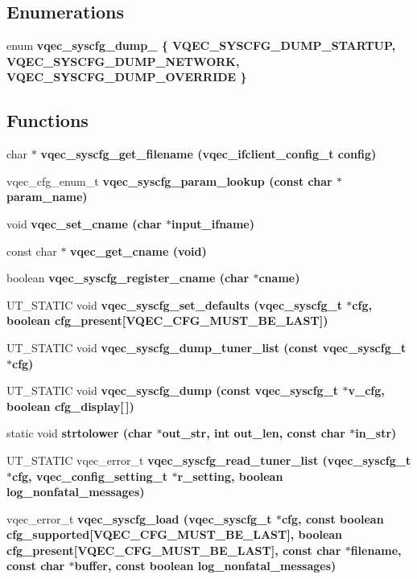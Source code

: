 \subsection*{Enumerations}
\begin{CompactItemize}
\item 
enum \bf{vqec\_\-syscfg\_\-dump\_\-} \{ \bf{VQEC\_\-SYSCFG\_\-DUMP\_\-STARTUP}, 
\bf{VQEC\_\-SYSCFG\_\-DUMP\_\-NETWORK}, 
\bf{VQEC\_\-SYSCFG\_\-DUMP\_\-OVERRIDE}
 \}
\end{CompactItemize}
\subsection*{Functions}
\begin{CompactItemize}
\item 
char $\ast$ \bf{vqec\_\-syscfg\_\-get\_\-filename} (\bf{vqec\_\-ifclient\_\-config\_\-t} config)
\item 
vqec\_\-cfg\_\-enum\_\-t \bf{vqec\_\-syscfg\_\-param\_\-lookup} (const char $\ast$param\_\-name)
\item 
void \bf{vqec\_\-set\_\-cname} (char $\ast$input\_\-ifname)
\item 
const char $\ast$ \bf{vqec\_\-get\_\-cname} (void)
\item 
boolean \bf{vqec\_\-syscfg\_\-register\_\-cname} (char $\ast$cname)
\item 
UT\_\-STATIC void \bf{vqec\_\-syscfg\_\-set\_\-defaults} (\bf{vqec\_\-syscfg\_\-t} $\ast$cfg, boolean cfg\_\-present[\bf{VQEC\_\-CFG\_\-MUST\_\-BE\_\-LAST}])
\item 
UT\_\-STATIC void \bf{vqec\_\-syscfg\_\-dump\_\-tuner\_\-list} (const \bf{vqec\_\-syscfg\_\-t} $\ast$cfg)
\item 
UT\_\-STATIC void \bf{vqec\_\-syscfg\_\-dump} (const \bf{vqec\_\-syscfg\_\-t} $\ast$v\_\-cfg, boolean cfg\_\-display[$\,$])
\item 
static void \bf{strtolower} (char $\ast$out\_\-str, int out\_\-len, const char $\ast$in\_\-str)
\item 
UT\_\-STATIC vqec\_\-error\_\-t \bf{vqec\_\-syscfg\_\-read\_\-tuner\_\-list} (\bf{vqec\_\-syscfg\_\-t} $\ast$cfg, \bf{vqec\_\-config\_\-setting\_\-t} $\ast$r\_\-setting, boolean log\_\-nonfatal\_\-messages)
\item 
vqec\_\-error\_\-t \bf{vqec\_\-syscfg\_\-load} (\bf{vqec\_\-syscfg\_\-t} $\ast$cfg, const boolean cfg\_\-supported[\bf{VQEC\_\-CFG\_\-MUST\_\-BE\_\-LAST}], boolean cfg\_\-present[\bf{VQEC\_\-CFG\_\-MUST\_\-BE\_\-LAST}], const char $\ast$\bf{filename}, const char $\ast$buffer, const boolean log\_\-nonfatal\_\-messages)

\end{CompactItemize}
